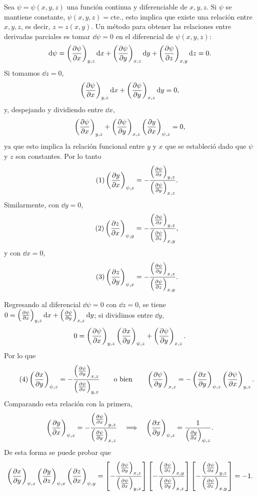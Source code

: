 Sea $\psi=\psi(x,y,z)$ una función continua y diferenciable de $x,y,z$. Si $\psi$ se mantiene
constante, $\psi(x,y,z)=\text{cte.}$, esto implica que existe una relación entre $x,y,z$, es decir,
$z=z(x,y)$. Un método para obtener las relaciones entre derivadas parciales es tomar $\dd\psi=0$ en
el diferencial de $\psi(x,y,z)$:
\begin{equation*}
  \dd\psi=\pdvc{\psi}{x}{y,z}\dd x+\pdvc{\psi}{y}{x,z}\dd y+\pdvc{\psi}{z}{x,y}\dd z=0.
\end{equation*}
Si tomamos $\dd z=0$,
\begin{equation*}
  \pdvc{\psi}{x}{y,z}\dd x+\pdvc{\psi}{y}{x,z}\dd y=0,
\end{equation*}
y, despejando y dividiendo entre $\dd x$,
\begin{equation*}
  \pdvc{\psi}{x}{y,z}+\pdvc{\psi}{y}{x,z}\pdvc{y}{x}{\psi,z}=0,
\end{equation*}
ya que esto implica la relación funcional entre $y$ y $x$ que se estableció dado que $\psi$ y $z$
son constantes. Por lo tanto
\begin{equation*}\tag{1}
  \pdvc{y}{x}{\psi,z}=-\frac{\pdvc{\psi}{x}{y,z}}{\pdvc{\psi}{y}{x,z}}.
\end{equation*}
Similarmente, con $\dd y=0$,
\begin{equation*}\tag{2}
  \pdvc{z}{x}{\psi,y}=-\frac{\pdvc{\psi}{x}{y,z}}{\pdvc{\psi}{z}{x,y}},
\end{equation*}
y con $\dd x=0$,
\begin{equation*}\tag{3}
  \pdvc{z}{y}{\psi,x}=-\frac{\pdvc{\psi}{y}{x,z}}{\pdvc{\psi}{z}{x,y}}.
\end{equation*}

Regresando al diferencial $\dd\psi=0$ con $\dd z=0$, se tiene
$0=\pdvc{\psi}{x}{y,z}\dd x+\pdvc{\psi}{y}{x,z}\dd y$; si dividimos entre $\dd y$,
\begin{equation*}
  0=\pdvc{\psi}{x}{y,z}\pdvc{x}{y}{\psi,z}+\pdvc{\psi}{y}{x,z}.
\end{equation*}
Por lo que
\begin{equation*}\tag{4}
  \pdvc{x}{y}{\psi,z}=-\frac{\pdvc{\psi}{y}{x,z}}{\pdvc{\psi}{x}{y,z}}
  \qquad\text{o bien}\qquad
  \pdvc{\psi}{y}{x,z}=-\pdvc{x}{y}{\psi,z}\pdvc{\psi}{x}{y,z}.
\end{equation*}
Comparando esta relación con la primera,
\begin{equation*}
  \pdvc{y}{x}{\psi,z}=-\frac{\pdvc{\psi}{x}{y,z}}{\pdvc{\psi}{y}{x,z}}
  \quad\Longrightarrow\quad
  \pdvc{x}{y}{\psi,z}=\frac{1}{\pdvc{y}{x}{\psi,z}}.
\end{equation*}
De esta forma se puede probar que
\begin{equation*}
  \pdvc{x}{y}{\psi,z}\pdvc{y}{z}{\psi,x}\pdvc{z}{x}{\psi,y}
  =\left[-\frac{\pdvc{\psi}{y}{x,z}}{\pdvc{\psi}{x}{y,z}}\right]
   \left[-\frac{\pdvc{\psi}{z}{x,y}}{\pdvc{\psi}{y}{x,z}}\right]
   \left[-\frac{\pdvc{\psi}{x}{y,z}}{\pdvc{\psi}{z}{x,y}}\right]
  =-1.
\end{equation*}


